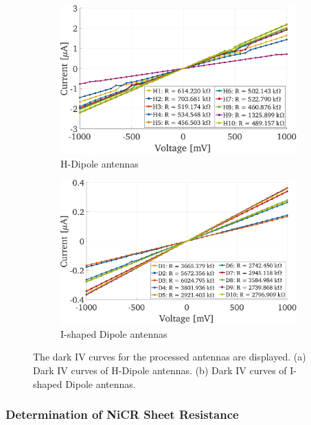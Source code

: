 \begin{figure}[!]
    \centering
    \begin{subfigure}[b]{0.49\textwidth}
        \centering
        \includegraphics[height=0.6\textwidth]{figures/IV_v3/IV_H_Dipoles.pdf}
        \caption{\centering
        H-Dipole antennas}
        \label{iv_HD}
    \end{subfigure}
    \hfill
    \begin{subfigure}[b]{0.49\textwidth}
        \centering
        \includegraphics[height=0.6\textwidth]{figures/IV_v3/IV_I_Dipoles.pdf}
        \caption{\centering
        I-shaped Dipole antennas}
        \label{iv_D}
    \end{subfigure}
    \caption{The dark IV curves for the processed antennas are displayed. (a) Dark IV curves of H-Dipole antennas. (b) Dark IV curves of I-shaped Dipole antennas.}
    \label{iv}
\end{figure}

\subsubsection{Determination of NiCR Sheet Resistance}

